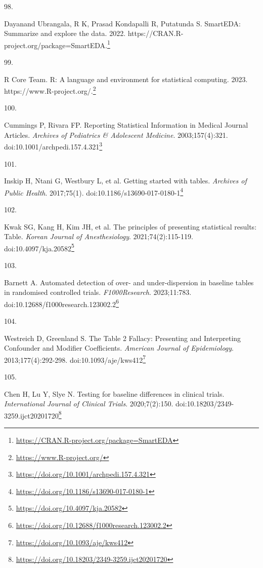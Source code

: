 \documentclass[
  a4paper,
]{book}
\newlength{\cslhangindent}
\newlength{\csllabelwidth}
\newlength{\cslentryspacingunit} %
\newenvironment{CSLReferences}[2] %
 {%
  \setlength{\parindent}{0pt}
  \ifodd #1
  \let\oldpar\par
  \def\par{\hangindent=\cslhangindent\oldpar}
  \fi
  \setlength{\parskip}{#2\cslentryspacingunit}
 }%
 {}
\newcommand{\CSLLeftMargin}[1]{\parbox[t]{\csllabelwidth}{#1}}
\newcommand{\CSLRightInline}[1]{\parbox[t]{\linewidth - \csllabelwidth}{#1}\break}
\renewcommand{\href}[2]{#2\footnote{\url{#1}}}
\begin{document}
\begin{CSLReferences}{0}{0}
\leavevmode{}%
\CSLLeftMargin{98. }%
\CSLRightInline{Dayanand Ubrangala, R K, Prasad Kondapalli R, Putatunda S. SmartEDA: Summarize and explore the data. 2022. \href{https://CRAN.R-project.org/package=SmartEDA}{https://CRAN.R-project.org/package=SmartEDA.}}

\leavevmode{}%
\CSLLeftMargin{99. }%
\CSLRightInline{R Core Team. R: A language and environment for statistical computing. 2023. \href{https://www.R-project.org/}{https://www.R-project.org/.}}

\leavevmode{}%
\CSLLeftMargin{100. }%
\CSLRightInline{Cummings P, Rivara FP. Reporting Statistical Information in Medical Journal Articles. \emph{Archives of Pediatrics \& Adolescent Medicine}. 2003;157(4):321. doi:\href{https://doi.org/10.1001/archpedi.157.4.321}{10.1001/archpedi.157.4.321}}

\leavevmode{}%
\CSLLeftMargin{101. }%
\CSLRightInline{Inskip H, Ntani G, Westbury L, et al. Getting started with tables. \emph{Archives of Public Health}. 2017;75(1). doi:\href{https://doi.org/10.1186/s13690-017-0180-1}{10.1186/s13690-017-0180-1}}

\leavevmode{}%
\CSLLeftMargin{102. }%
\CSLRightInline{Kwak SG, Kang H, Kim JH, et al. The principles of presenting statistical results: Table. \emph{Korean Journal of Anesthesiology}. 2021;74(2):115-119. doi:\href{https://doi.org/10.4097/kja.20582}{10.4097/kja.20582}}

\leavevmode{}%
\CSLLeftMargin{103. }%
\CSLRightInline{Barnett A. Automated detection of over- and under-dispersion in baseline tables in randomised controlled trials. \emph{F1000Research}. 2023;11:783. doi:\href{https://doi.org/10.12688/f1000research.123002.2}{10.12688/f1000research.123002.2}}

\leavevmode{}%
\CSLLeftMargin{104. }%
\CSLRightInline{Westreich D, Greenland S. The Table 2 Fallacy: Presenting and Interpreting Confounder and Modifier Coefficients. \emph{American Journal of Epidemiology}. 2013;177(4):292-298. doi:\href{https://doi.org/10.1093/aje/kws412}{10.1093/aje/kws412}}

\leavevmode{}%
\CSLLeftMargin{105. }%
\CSLRightInline{Chen H, Lu Y, Slye N. Testing for baseline differences in clinical trials. \emph{International Journal of Clinical Trials}. 2020;7(2):150. doi:\href{https://doi.org/10.18203/2349-3259.ijct20201720}{10.18203/2349-3259.ijct20201720}}


\end{CSLReferences}
\end{document}
